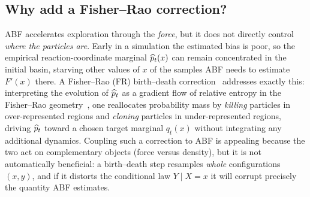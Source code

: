 \subsection{Why add a Fisher--Rao correction?}
ABF accelerates exploration through the \emph{force}, but it does not directly
control \emph{where the particles are}. Early in a simulation the estimated bias
is poor, so the empirical reaction-coordinate marginal $\widehat{p}_t(x)$ can remain
concentrated in the initial basin, starving other values of $x$ of the samples
ABF needs to estimate $F'(x)$ there. A Fisher--Rao (FR) birth--death
correction~\citep{LuLuNolen2019} addresses exactly this: interpreting the
evolution of $\widehat{p}_t$ as a gradient flow of relative entropy in the
Fisher--Rao geometry~\citep{Amari2016}, one reallocates probability mass by
\emph{killing} particles in over-represented regions and \emph{cloning}
particles in under-represented regions, driving $\widehat{p}_t$ toward a chosen target
marginal $q_t(x)$ without integrating any additional dynamics. Coupling such a
correction to ABF is appealing because the two act on complementary objects
(force versus density), but it is not automatically beneficial: a birth--death
step resamples \emph{whole} configurations $(x,y)$, and if it distorts the
conditional law $Y\mid X=x$ it will corrupt precisely the quantity ABF estimates.

